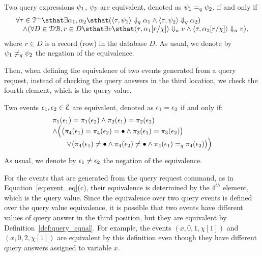 {{\begin{defn}
%
\label{def:query_equal}
Two query expressions $\psi_1$, $\psi_2$ are equivalent, denoted as $\psi_1 =_{q} \psi_2$, if and only if
\[
 \begin{array}{l} 
 \forall \trace \in \ftdom \sthat \exists \qval_1, \qval_2 
 \sthat
 (\config{\trace, \qexpr_1} \qarrow \qval_1 \land \config{\trace, \qexpr_2 } \qarrow \qval_2) 
 \\
 \quad \land (\forall D \in \dbdom, r \in D \sthat 
 \exists v 
 \sthat 
 \config{\trace, \qval_1[r/\chi]} \aarrow v \land \config{\trace, \qval_2[r/\chi] } \aarrow v), 
 \end{array}
 \]
where $r \in D$ is a record (row) in the database $D$. 
As usual, we denote by $\psi_1 \neq_{q} \psi_2$ the negation of the equivalence.
\end{defn}
%
Then, when defining the equivalence of two events generated from a query request,
instead of checking the query answers in the third location,
we check the fourth element, which is the query value.
\begin{defn}
 \label{def:event_eq}
 Two events $\mathtt{\epsilon}_1, \mathtt{\epsilon}_2 \in \mathcal{E}$ are equivalent, 
 denoted as $\mathtt{\epsilon}_1 = \mathtt{\epsilon}_2$ 
 if and only if:
 \begin{equation}
 \label{eq:event_eq}
 \begin{array}{l}
 \pi_1(\mathtt{\epsilon}_1) = \pi_1(\mathtt{\epsilon}_2) 
 \land 
 \pi_2(\mathtt{\epsilon}_1) = \pi_2(\mathtt{\epsilon}_2) 
\\
 \land 
 \Big( 
 \big(\pi_{4}(\mathtt{\epsilon}_1) = \pi_{4}(\mathtt{\epsilon}_2) = \bullet \land
 \pi_{3}(\mathtt{\epsilon}_1) = \pi_{3}(\mathtt{\epsilon}_2) \big)
 \\ \qquad 
 \lor \big(
 \pi_{4}(\mathtt{\epsilon}_1) \neq \bullet \land \pi_{4}(\mathtt{\epsilon}_2) \neq \bullet
 \land
 \pi_{4}(\mathtt{\epsilon}_1) =_q \pi_{4}(\mathtt{\epsilon}_2)\big)
 \Big)
 \end{array}
 \end{equation}
 As usual, we denote by $\mathtt{\epsilon}_1 \neq \mathtt{\epsilon}_2$ the negation of the equivalence.
\end{defn}
For the events that are generated from the query request command, as in Equation~\ref{eq:event_eq}(c),
their equivalence is determined by the $4^{th}$ element, which is the query value.
Since the equivalence over two query events is defined over the query value equivalence, 
it is possible that two events have different values of query answer in the third position, but they
are equivalent by Definition~\ref{def:query_equal}.
For example, the events $(x, 0, 1, \chi[1])$ and $(x, 0, 2, \chi[1])$ are equivalent by this definition even though they have different query answers assigned to variable $x$.

}}
